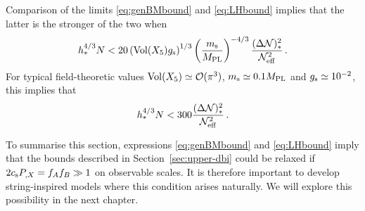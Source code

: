 Comparison of the limits \eqref{eq:genBMbound} and \eqref{eq:LHbound}
implies that the latter is the stronger of the two when
% 
\begin{equation}
\label{eq:LHstronger}
h_*^{4/3}N < 20 \left( \mathrm{Vol} (X_5) g_\mathrm{s} \right)^{1/3}  
\left( \frac{m_\mathrm{s}}{M_{\mathrm{PL}}} \right)^{-4/3} 
\frac{( \Delta \mathcal{N} )_*^2}{\mathcal{N}_\mathrm{eff}^2} \,.
\end{equation}
% 
For typical field-theoretic values $\mathrm{Vol} (X_5) \simeq \mathcal{O}(\pi^3)$, $m_\mathrm{s} \simeq
0.1 M_{\mathrm{PL}}$ 
and  $g_\mathrm{s} \simeq 10^{-2}$, this implies that
%  
\begin{equation}
\label{eq:LHstronger1}
h_*^{4/3} N < 300 \frac{(\Delta \mathcal{N})^2_*}{\mathcal{N}_\mathrm{eff}^2} \,.
\end{equation}
% 

To summarise this section, 
expressions \eqref{eq:genBMbound} and \eqref{eq:LHbound} imply that the 
bounds described in Section~\ref{sec:upper-dbi}
could be relaxed if $2c_\mathrm{s}P_{,X} = f_Af_B \gg 1$ on observable scales. 
It is therefore important to develop string-inspired models 
where this condition arises naturally. We will explore this possibility in the
next chapter.


